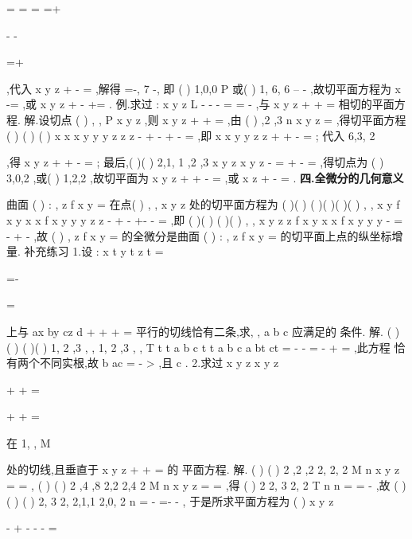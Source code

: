 =
=
=
\Rightarrow 
=+

-
-

=+

,代入
x
y
z
+
-
=
,解得
\lambda =-, 7
-, 
即
(
)
1,0,0
P
或(
)
1, 6, 6
--
-
,故切平面方程为
x -=
,或
x
y
z
+
-
+=
. 
\textcolor{lyred}{例}.求过
:
x
y
z
L
-
-
-
=
=
-
,与
x
y
z
+
+
=
相切的平面方程. 
解.设切点
(
)
,
,
P x
y z
,则
x
y
z
+
+
=
,由
(
)
,2
,3
n
x
y
z
=
\rho 
,得切平面方程 
(
)
(
)
(
)
x
x
x
y
y
y
z
z
z
-
+
-
+
-
=
,即
x x
y y
z z
+
+
-
=
; 
代入
6,3, 2






,得
x
y
z
+
+
-
=
; 
最后,(
)(
)
2,1, 1
,2
,3
x
y
z
x
y
z
-
\cdots 
=
\Rightarrow 
+
-
=
,得切点为 
(
)
3,0,2 ,或(
)
1,2,2 ,故切平面为
x
y
z
+
+
-
=
,或
x
z
+
-
=
. 
\vspace{4pt}
{\bfseries \textcolor{lyred}{四.全微分的几何意义}}

曲面
(
)
:
,
z
f x y
\Sigma 
=
在点(
)
,
,
x
y
z
处的切平面方程为 
(
)(
)
(
)(
)(
)(
)
,
,
x
y
f
x
y
x
x
f
x
y
y
y
z
z
-
+
-
+-
-
=
,即 
(
)(
)
(
)(
)
,
,
x
y
z
z
f
x
y
x
x
f
x
y
y
y
-
=
-
+
-
,故
(
)
,
z
f x y
=
的全微分是曲面 
(
)
:
,
z
f x y
\Sigma 
=
的切平面上点的纵坐标增量. 
\textcolor{lyred}{补充练习 }
1.设
:
x
t
y
t
z
t
=


\Gamma 
=-

=

上与
ax
by
cz
d
+
+
+
=
平行的切线恰有二条,求, ,
a b c 应满足的 
条件. 
解.
(
)
(
)
(
)(
)
1, 2 ,3
, ,
1, 2 ,3
, ,
T
t
t
a b c
t
t
a b c
a
bt
ct
=
-
\bot
\Rightarrow 
-
\cdots 
=
\Rightarrow 
-
+
=
\rho 
,此方程 
恰有两个不同实根,故
b
ac
\Delta =
-
>
,且
c \neq 
. 
2.求过
x
y
z
x
y
z

+
+
=

+
+
=

在
1,
,
M 







处的切线,且垂直于
x
y
z
+
+
=
的 
平面方程. 
解.
(
)
(
)
2 ,2 ,2
2,
2, 2
M
n
x
y
z
=
=
\rho 
,
(
)
(
)
2 ,4 ,8
2,2 2,4 2
M
n
x
y
z
=
=
\rho 
,得 
(
)
2 2, 3 2, 2
T
n
n
=
\times 
=
-
\rho 
\rho 
\rho 
,故
(
)(
)
(
)
2, 3 2,
2,1,1
2,0, 2
n =
-
\times 
=-
-
\rho 
, 
于是所求平面方程为
(
)
x
y
z




\cdots 
-
+\cdots 
-
-\cdots 
-
=












